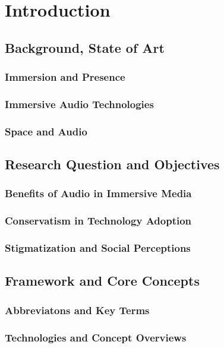 \chapter{Introduction}
    \section{Background, State of Art}
        \subsection{Immersion and Presence}
        \subsection{Immersive Audio Technologies}
        \subsection{Space and Audio}
    \section{Research Question and Objectives}
        \subsection{Benefits of Audio in Immersive Media}
        \subsection{Conservatism in Technology Adoption}
        \subsection{Stigmatization and Social Perceptions}
    \section{Framework and Core Concepts}
        \subsection{Abbreviatons and Key Terms}
        \subsection{Technologies and Concept Overviews}
